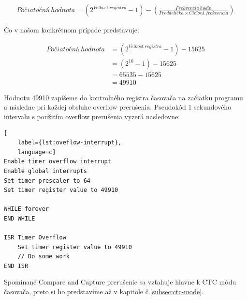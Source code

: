 \begin{equation} \label{eq:start-value}
    \begin{aligned}
        Počiatočná\:hodnota =  (2^{Veľkosť\:registra} - 1) - (\frac{Frekvencia\:hodín}{Preddelička \times Cieľová\:frekvencia})
    \end{aligned}
\end{equation}

Čo v našom konkrétnom prípade predstavuje:

\begin{equation}
    \begin{aligned}
        Počiatočná\:hodnota & =  (2^{Veľkosť\:registra} - 1) - 15625 \\
                            & =  (2^{16} - 1) - 15625                \\
                            & =  65535 - 15625                       \\
                            & =  49910
    \end{aligned}
\end{equation}

Hodnotu 49910 zapíšeme do kontrolného registra časovača na začiatku programu a následne pri
každej obsluhe overflow prerušenia. Pseudokód 1 sekundového intervalu s použitím overflow prerušenia vyzerá nasledovne:

\begin{lstlisting}[
    label={lst:oveflow-interrupt},
    language=c]  
Enable timer overflow interrupt
Enable global interrupts
Set timer prescaler to 64
Set timer register value to 49910

WHILE forever
END WHILE

ISR Timer Overflow
    Set timer register value to 49910
    // Do some work
END ISR

\end{lstlisting}

Spomínané Compare and Capture prerušenie sa vzťahuje hlavne k CTC módu časovača, preto si ho predstavíme až v kapitole č.\ref{subsec:ctc-mode}.


